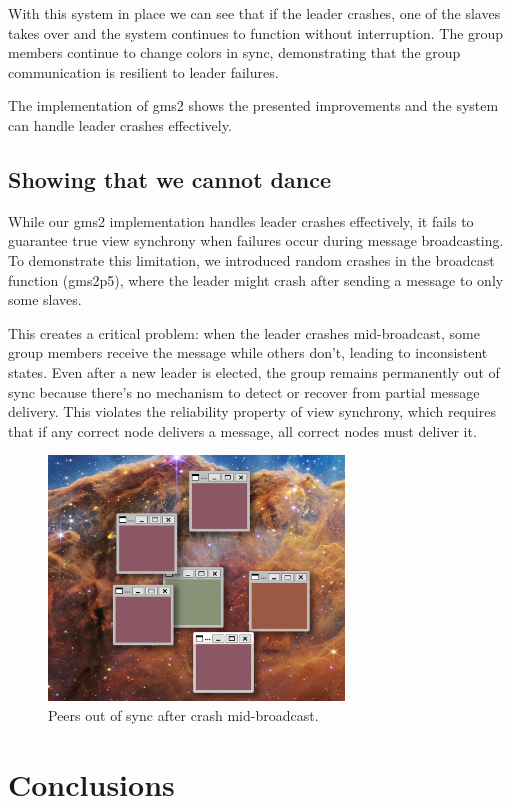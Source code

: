 \documentclass[a4paper, 11pt]{article}
\begin{document}
With this system in place we can see that if the leader crashes, one of the slaves takes over and the system continues to function without interruption. The group members continue to change colors in sync, demonstrating that the group communication is resilient to leader failures.

The implementation of gms2 shows the presented improvements and the system can handle leader crashes effectively.

\subsection{Showing that we cannot dance}

While our gms2 implementation handles leader crashes effectively, it fails to guarantee true view synchrony when failures occur during message broadcasting. To demonstrate this limitation, we introduced random crashes in the broadcast function (gms2p5), where the leader might crash after sending a message to only some slaves.

This creates a critical problem: when the leader crashes mid-broadcast, some group members receive the message while others don't, leading to inconsistent states. Even after a new leader is elected, the group remains permanently out of sync because there's no mechanism to detect or recover from partial message delivery. This violates the reliability property of view synchrony, which requires that if any correct node delivers a message, all correct nodes must deliver it.

\begin{figure}[H]
  \centering
  \includegraphics[width=0.7\textwidth]{imgs/out_of_sync.png}
  \caption{Peers out of sync after crash mid-broadcast.}
  \label{fig:out_of_sync}
\end{figure}



\section{Conclusions}
\end{document}
